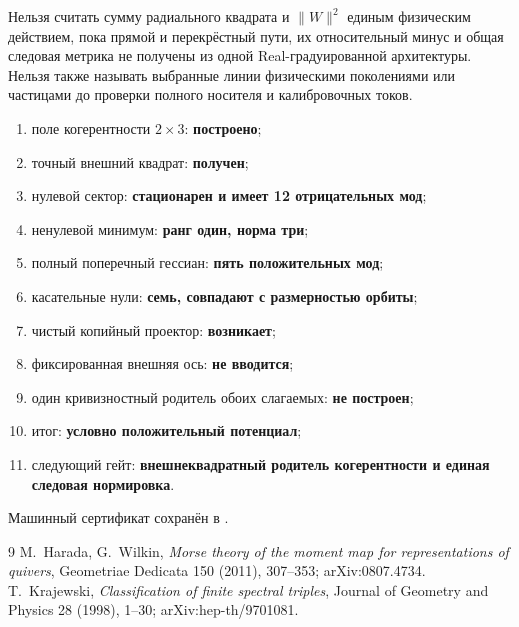 \begin{nogocriterion}
Нельзя считать сумму радиального квадрата и $\|W\|^2$ единым физическим
действием, пока прямой и перекрёстный пути, их относительный минус и общая
следовая метрика не получены из одной Real-градуированной архитектуры.
Нельзя также называть выбранные линии физическими поколениями или частицами
до проверки полного носителя и калибровочных токов.
\end{nogocriterion}

\begin{protocol}
\begin{enumerate}
 \item поле когерентности $2\times3$: \textbf{построено};
 \item точный внешний квадрат: \textbf{получен};
 \item нулевой сектор: \textbf{стационарен и имеет 12 отрицательных мод};
 \item ненулевой минимум: \textbf{ранг один, норма три};
 \item полный поперечный гессиан: \textbf{пять положительных мод};
 \item касательные нули: \textbf{семь, совпадают с размерностью орбиты};
 \item чистый копийный проектор: \textbf{возникает};
 \item фиксированная внешняя ось: \textbf{не вводится};
 \item один кривизностный родитель обоих слагаемых: \textbf{не построен};
 \item итог: \textbf{условно положительный потенциал};
 \item следующий гейт: \textbf{внешнеквадратный родитель когерентности и
 единая следовая нормировка}.
\end{enumerate}
\end{protocol}

Машинный сертификат сохранён в
.

\begin{thebibliography}{9}
M.~Harada, G.~Wilkin,
\emph{Morse theory of the moment map for representations of quivers},
Geometriae Dedicata 150 (2011), 307--353; arXiv:0807.4734.
T.~Krajewski,
\emph{Classification of finite spectral triples},
Journal of Geometry and Physics 28 (1998), 1--30;
arXiv:hep-th/9701081.
\end{thebibliography}